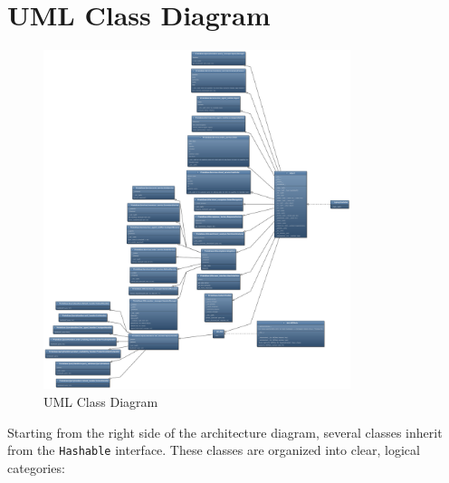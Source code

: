 \documentclass[11pt]{article}
\begin{document}
\newpage
\section{UML Class Diagram}
\begin{figure}[h!]
    \centering
    \includegraphics[width=0.8\textwidth,height=0.89\textheight]{diagram.png}
    \caption{UML Class Diagram}
\end{figure}
\noindent
Starting from the right side of the architecture diagram, several classes inherit from the \texttt{Hashable} interface. These classes are organized into clear, logical categories:
\end{document}
